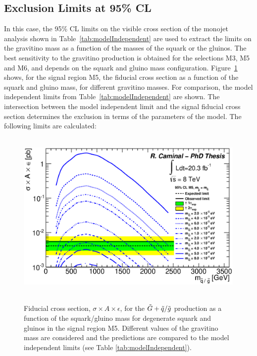 \subsection{Exclusion Limits at 95\% CL}

In this case, the 95\% CL limits on the visible cross section of the monojet analysis shown in Table~\ref{tab:modelIndependent} are used to extract the limits on the gravitino mass as a function of the masses of the squark or the gluinos.
The best sensitivity to the gravitino production is obtained for the selections M3, M5 and M6, and depends on the squark and gluino mass configuration.
Figure~\ref{fig:modelIndependentGravitino} shows, for the signal region M5, the fiducial cross section as a function of the squark and gluino mass, for different gravitino masses.
For comparison, the model independent limits from Table~\ref{tab:modelIndependent} are shown.
The intersection between the model independent limit and the signal fiducial cross section determines the exclusion in terms of the parameters of the model.
The following limits are calculated:

\begin{figure}[!ht]
\begin{center}
\mbox{
\includegraphics[width=0.995\textwidth]{Interpretations/Figures/ModelIndependentGravitino_mGVariable_Stop_A9.eps}
}
\end{center}
\caption[Fiducial cross section for the $\gravino + \squark / \gluino$ production as a function of the squark/gluino mass for degenerate squark and gluinos in the signal region M5.]{Fiducial cross section, $\sigma \times A \times \epsilon$, for the $\gravino + \squark / \gluino$ production as a function of the squark/gluino mass for degenerate squark and gluinos in the signal region M5. Different values of the gravitino mass are considered and the predictions are compared to the model independent limits (see Table \ref{tab:modelIndependent}).}
\label{fig:modelIndependentGravitino}
\end{figure}

